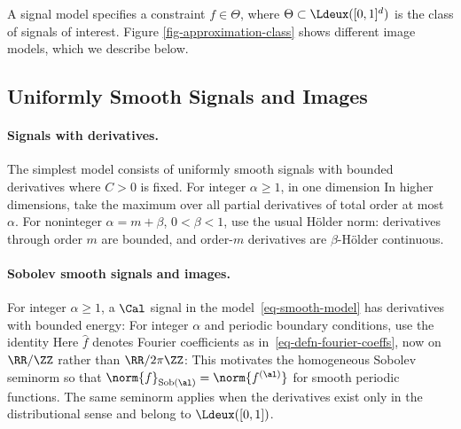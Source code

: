 A signal model specifies a constraint $f \in \Theta$, where $\Theta \subset \Ldeux([0,1]^d)$ is the class of signals of interest.
Figure \ref{fig-approximation-class} shows different image models, which we describe below.




\subsection{Uniformly Smooth Signals and Images}
\label{subsec-smooth-class}

\paragraph{Signals with derivatives.}

The simplest model consists of uniformly smooth signals with bounded derivatives
where $C>0$ is fixed. For integer $\alpha\geq1$, in one dimension
In higher dimensions, take the maximum over all partial derivatives of total order at most $\alpha$. For noninteger $\alpha=m+\beta$, $0<\beta<1$, use the usual H\"older norm: derivatives through order $m$ are bounded, and order-$m$ derivatives are $\beta$-H\"older continuous.

\paragraph{Sobolev smooth signals and images.}

For integer $\alpha\geq1$, a $\Cal$ signal in the model~\eqref{eq-smooth-model} has derivatives with bounded energy:
For integer $\alpha$ and periodic boundary conditions, use the identity
Here $\hat f$ denotes Fourier coefficients as in~\eqref{eq-defn-fourier-coeffs}, now on $\RR/\ZZ$ rather than $\RR/2\pi\ZZ$:
This motivates the homogeneous Sobolev seminorm
so that $\norm{f}_{\text{Sob}(\al)} = \norm{f^{(\al)}}$ for smooth periodic functions. The same seminorm applies when the derivatives exist only in the distributional sense and belong to $\Ldeux([0,1])$.

